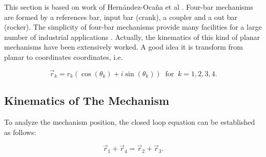 \documentclass[12pt,letterpape]{article}
\begin{document}
This section is based on work of Hern{\'a}ndez-Oca{\~n}a et al \cite{hernandez2016}.
Four-bar mechanisms are formed by a references bar, input bar (crank), a coupler
and a out bar (rocker). The simplicity of four-bar mechanisms provide many facilities
for a large number of industrial applications \cite{david2005, mccarthy6, toussaint3}.
Actually, the kinematics of this kind of planar mechanisms have been extensively
worked. A good idea it is transform from planar to coordinates coordinates, i.e.

\begin{equation}
	\vec{r}_k = r_k ( \cos(\theta_k) + i \sin( \theta_k ) ) \ \text{ for } \ k = 1,2,3,4.
	\label{eqn:rpolar}
\end{equation}

\subsection{Kinematics of The Mechanism} %
\label{sub:kinematics_of_the_mechanism}

To analyze the mechanism position, the closed loop equation can be established as follows:

\begin{equation}
	\vec{r}_1 + \vec{r}_4 = \vec{r}_2 + \vec{r}_3.
	\label{eqn:sumsr}
\end{equation}
\end{document}
